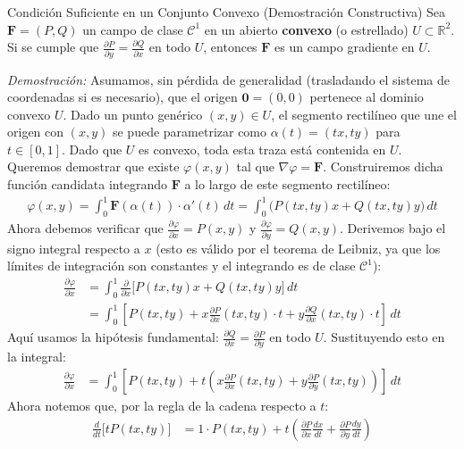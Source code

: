 \documentclass[11pt,a4paper]{article}
\begin{document}
\begin{teoremabox}{Condición Suficiente en un Conjunto Convexo (Demostración Constructiva)}
Sea $\mathbf{F} = (P, Q)$ un campo de clase $\mathcal{C}^1$ en un abierto \textbf{convexo} (o estrellado) $U \subset \mathbb{R}^2$. Si se cumple que $\frac{\partial P}{\partial y} = \frac{\partial Q}{\partial x}$ en todo $U$, entonces $\mathbf{F}$ es un campo gradiente en $U$.

\textit{Demostración:}
Asumamos, sin pérdida de generalidad (trasladando el sistema de coordenadas si es necesario), que el origen $\mathbf{0} = (0,0)$ pertenece al dominio convexo $U$. Dado un punto genérico $(x,y) \in U$, el segmento rectilíneo que une el origen con $(x,y)$ se puede parametrizar como $\alpha(t) = (tx, ty)$ para $t \in [0,1]$.
Dado que $U$ es convexo, toda esta traza está contenida en $U$.
Queremos demostrar que existe $\varphi(x,y)$ tal que $\nabla \varphi = \mathbf{F}$. Construiremos dicha función candidata integrando $\mathbf{F}$ a lo largo de este segmento rectilíneo:
\begin{align*}
\varphi(x,y) = \int_0^1 \mathbf{F}(\alpha(t)) \cdot \alpha'(t) \, dt = \int_0^1 \big( P(tx, ty) x + Q(tx, ty) y \big) \, dt
\end{align*}
Ahora debemos verificar que $\frac{\partial \varphi}{\partial x} = P(x,y)$ y $\frac{\partial \varphi}{\partial y} = Q(x,y)$.
Derivemos bajo el signo integral respecto a $x$ (esto es válido por el teorema de Leibniz, ya que los límites de integración son constantes y el integrando es de clase $\mathcal{C}^1$):
\begin{align*}
\frac{\partial \varphi}{\partial x} &= \int_0^1 \frac{\partial}{\partial x} \big[ P(tx, ty) x + Q(tx, ty) y \big] \, dt \\
&= \int_0^1 \left[ P(tx, ty) + x \frac{\partial P}{\partial x}(tx, ty)\cdot t + y \frac{\partial Q}{\partial x}(tx, ty)\cdot t \right] \, dt
\end{align*}
Aquí usamos la hipótesis fundamental: $\frac{\partial Q}{\partial x} = \frac{\partial P}{\partial y}$ en todo $U$. Sustituyendo esto en la integral:
\begin{align*}
\frac{\partial \varphi}{\partial x} &= \int_0^1 \left[ P(tx, ty) + t \left( x \frac{\partial P}{\partial x}(tx, ty) + y \frac{\partial P}{\partial y}(tx, ty) \right) \right] \, dt
\end{align*}
Ahora notemos que, por la regla de la cadena respecto a $t$:
\begin{align*}
\frac{d}{dt} \big[ t P(tx, ty) \big] &= 1 \cdot P(tx, ty) + t \left( \frac{\partial P}{\partial x} \frac{dx}{dt} + \frac{\partial P}{\partial y} \frac{dy}{dt} \right) \\

\end{align*}
\end{teoremabox}
\end{document}

